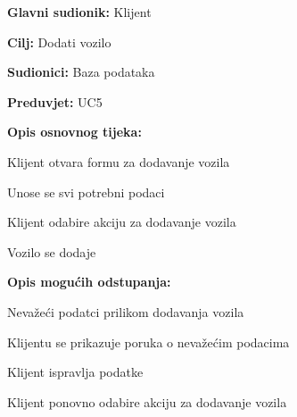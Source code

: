 \noindent {}
\begin{packed_item}

	\item \textbf{Glavni sudionik:} Klijent
	\item \textbf{Cilj:} Dodati vozilo
	\item \textbf{Sudionici:} Baza podataka
	\item \textbf{Preduvjet:} UC5
	\item \textbf{Opis osnovnog tijeka:}
	
	\item[] \begin{packed_enum}
		
		\item Klijent otvara formu za dodavanje vozila
		\item Unose se svi potrebni podaci
		\item Klijent odabire akciju za dodavanje vozila
		\item Vozilo se dodaje

	\end{packed_enum}
	
	\item  \textbf{Opis mogućih odstupanja:}
	
	\item[] \begin{packed_item}
		
		\item[6.a] Nevažeći podatci prilikom dodavanja vozila
		\item[] \begin{packed_enum}
			
			\item Klijentu se prikazuje poruka o nevažećim podacima
			\item Klijent ispravlja podatke
			\item Klijent ponovno odabire akciju za dodavanje vozila
			
		\end{packed_enum}
		
	\end{packed_item}
\end{packed_item}

\pagebreak

